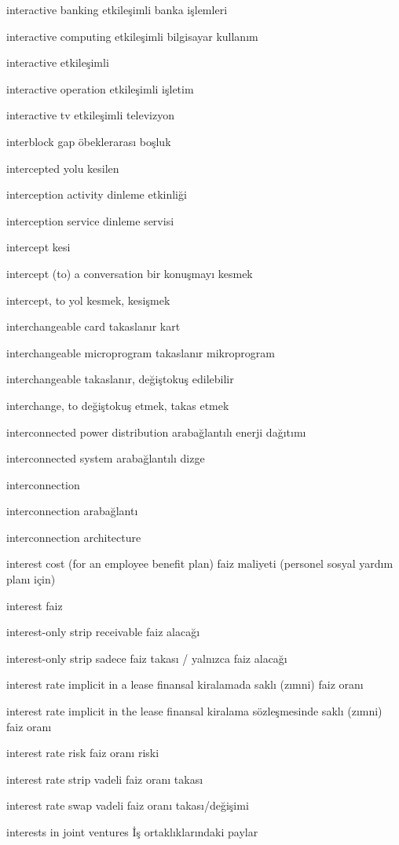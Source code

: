 \documentclass[12pt,fleqn]{article}\usepackage{../../common}
\begin{document}
interactive banking etkileşimli banka işlemleri

interactive computing etkileşimli bilgisayar kullanım

interactive etkileşimli

interactive operation etkileşimli işletim

interactive tv etkileşimli televizyon

interblock gap öbeklerarası boşluk

intercepted yolu kesilen

interception activity dinleme etkinliği

interception service dinleme servisi

intercept kesi

intercept (to) a conversation bir konuşmayı kesmek

intercept, to yol kesmek, kesişmek

interchangeable card takaslanır kart

interchangeable microprogram takaslanır mikroprogram

interchangeable takaslanır, değiştokuş edilebilir

interchange, to değiştokuş etmek, takas etmek

interconnected power distribution arabağlantılı enerji dağıtımı

interconnected system arabağlantılı dizge

interconnection

interconnection arabağlantı

interconnection architecture

interest cost (for an employee benefit plan) faiz maliyeti (personel sosyal yardım planı için)

interest faiz

interest-only strip receivable faiz alacağı

interest-only strip sadece faiz takası / yalnızca faiz alacağı

interest rate implicit in a lease finansal kiralamada saklı (zımni) faiz oranı

interest rate implicit in the lease finansal kiralama sözleşmesinde saklı (zımni) faiz oranı

interest rate risk faiz oranı riski

interest rate strip vadeli faiz oranı takası

interest rate swap vadeli faiz oranı takası/değişimi

interests in joint ventures İş ortaklıklarındaki paylar
\end{document}
